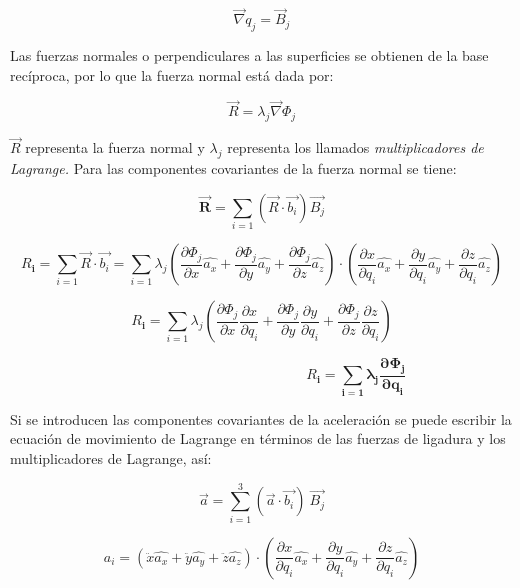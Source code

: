 \documentclass[]{article}
\begin{document}
\[\overrightarrow{\nabla}q_{j} = {\overrightarrow{B}}_{j}\]

Las fuerzas normales o perpendiculares a las superficies se obtienen de
la base recíproca, por lo que la fuerza normal está dada por:

\[\overrightarrow{R} = \lambda_{j}\overrightarrow{\nabla}\Phi_{j}\]

\(\overrightarrow{R}\) representa la fuerza normal y \(\lambda_{j}\)
representa los llamados \emph{multiplicadores de Lagrange.} Para las
componentes covariantes de la fuerza normal se tiene:

\[\overrightarrow{\mathbf{R}} = \sum_{i = 1}^{}\left( \overrightarrow{R} \cdot \overrightarrow{b_{i}} \right)\overrightarrow{B_{j}}\]

\[R_{\mathbf{i}} = \sum_{i = 1}^{}{\overrightarrow{R} \cdot \overrightarrow{b_{i}}} = \sum_{i = 1}^{}\lambda_{j}\left( \frac{\partial\Phi_{j}}{\partial x}\widehat{a_{x}} + \frac{\partial\Phi_{j}}{\partial y}\widehat{a_{y}} + \frac{\partial\Phi_{j}}{\partial z}\widehat{a_{z}} \right) \cdot \left( \frac{\partial x}{\partial q_{i}}\widehat{a_{x}} + \frac{\partial y}{\partial q_{i}}\widehat{a_{y}} + \frac{\partial z}{\partial q_{i}}\widehat{a_{z}} \right)\]

\[R_{\mathbf{i}} = \sum_{i = 1}^{}\lambda_{j}\left( \frac{\partial\Phi_{j}}{\partial x}\frac{\partial x}{\partial q_{i}} + \frac{\partial\Phi_{j}}{\partial y}\frac{\partial y}{\partial q_{i}} + \frac{\partial\Phi_{j}}{\partial z}\frac{\partial z}{\partial q_{i}} \right)\]

\[\mathbf{\ \ \ \ \ \ \ \ \ \ \ \ \ \ \ \ \ \ \ \ \ \ \ \ \ \ \ \ \ \ \ \ \ \ \ \ \ \ \ \ \ \ \ \ \ \ \ \ \ \ \ \ \ \ \ \ \ \ \ \ \ }R_{\mathbf{i}}\mathbf{=}\sum_{\mathbf{i = 1}}^{}{\mathbf{\lambda}_{\mathbf{j}}\frac{\mathbf{\partial}\mathbf{\Phi}_{\mathbf{j}}}{\mathbf{\partial}\mathbf{q}_{\mathbf{i}}}}\]

Si se introducen las componentes covariantes de la aceleración se puede
escribir la ecuación de movimiento de Lagrange en términos de las
fuerzas de ligadura y los multiplicadores de Lagrange, así:

\[\overrightarrow{a} = \sum_{i = 1}^{3}(\overrightarrow{a} \cdot \overrightarrow{b_{i}})\ \overrightarrow{B_{j}}\]

\[a_{i} = \left( \ddot{x}\widehat{a_{x}} + \ddot{y}\widehat{a_{y}} + \ddot{z}\widehat{a_{z}} \right) \cdot \left( \frac{\partial x}{\partial q_{i}}\widehat{a_{x}} + \frac{\partial y}{\partial q_{i}}\widehat{a_{y}} + \frac{\partial z}{\partial q_{i}}\widehat{a_{z}} \right)\]
\end{document}
